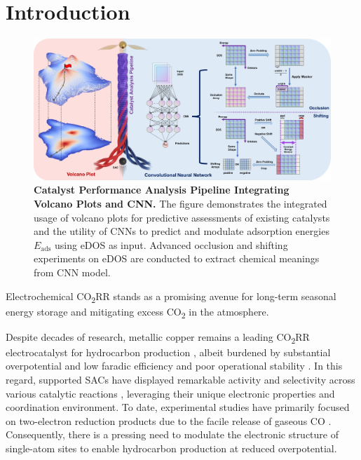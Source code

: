 
\section{Introduction}
\label{main_sec_intro}

\begin{figure}
    \centering
    \includegraphics[width=0.95\linewidth]{main_fig1_pipeline.JPG}
    \caption{\textbf{Catalyst Performance Analysis Pipeline Integrating Volcano Plots and CNN.}
    The figure demonstrates the integrated usage of volcano plots for
    predictive assessments of existing catalysts and the utility of CNNs
    to predict and modulate adsorption energies \(E_{\text{ads}}\) using eDOS as input.
    Advanced occlusion and shifting experiments on eDOS are conducted to extract chemical meanings from CNN model.}
    \label{main_fig1:pipeline}
\end{figure}

Electrochemical CO\textsubscript{2}RR stands as a promising avenue for long-term
seasonal energy storage \cite{dinh2018co2} and mitigating excess CO\textsubscript{2} in the atmosphere.

Despite decades of research, metallic copper remains a leading CO\textsubscript{2}RR electrocatalyst
for hydrocarbon production \cite{osella2023co2}, albeit burdened by substantial overpotential
and low faradic efficiency and poor operational stability \cite{chen2019identifying, liu2021co2}.
In this regard, supported SACs have displayed remarkable activity and selectivity
across various catalytic reactions \cite{wang2018heterogeneous, yang2018atomically},
leveraging their unique electronic properties and coordination environment.
To date, experimental studies have primarily focused on two-electron reduction products
due to the facile release of gaseous CO \cite{cai2021insights, ju2017understanding, ren2019isolated}.
Consequently, there is a pressing need to modulate the electronic structure of single-atom sites
to enable hydrocarbon production at reduced overpotential.

